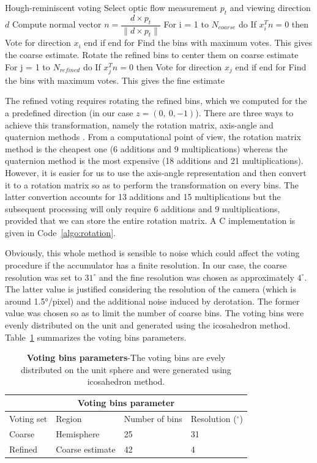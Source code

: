 \begin{algorithm}[colback=white, label=algo:houghVoting]{Hough-reminiscent voting}
Select optic flow measurement $p_t$ and viewing direction $d$
Compute normal vector $n = \dfrac{d \times p_t}{\|d \times p_t\|}$
For i = 1 to $N_{coarse}$ do
   If $x_i^Tn = 0$ then
      Vote for direction $x_i$
   end if
end for
Find the bins with maximum votes. This gives the coarse estimate.
Rotate the refined bins to center them on coarse estimate
For j = 1 to $N_{refined}$ do
   If $x_j^Tn = 0$ then
      Vote for direction $x_j$
   end if
end for
Find the bins with maximum votes. This gives the fine estimate
\end{algorithm}

The refined voting requires rotating the refined bins, which we computed for the a predefined direction (in our case $z = (0,~ 0,-1)$). There are three ways to achieve this transformation, namely the rotation matrix, axis-angle and quaternion methods \cite{rotation}. From a computational point of view, the rotation matrix method is the cheapest one (6 additions and 9 multiplications) whereas the quaternion method is the most expensive (18 additions and 21 multiplications). However, it is easier for us to use the axis-angle representation and then convert it to a rotation matrix so as to perform the transformation on every bins. The latter convertion accounts for 13 additions and 15 multiplications but the subsequent processing will only require 6 additions and 9 multiplications, provided that we can store the entire rotation matrix. A C implementation is given in Code~\ref{algo:rotation}.

Obviously, this whole method is sensible to noise which could affect the voting procedure if the accumulator has a finite resolution. In our case, the coarse resolution was set to $31^\circ$ and the fine resolution was chosen as approximately $4^\circ$. The latter value is justified considering the resolution of the camera (which is around 1.5°/pixel) and the additional noise induced by derotation. The former value was chosen so as to limit the number of coarse bins. The voting bins were evenly distributed on the unit and generated using the icosahedron method. Table~\ref{tab:votingBins} summarizes the voting bins parameters.

\begin{table}[h!]
	\centering
	\begin{tabular}{|p{2cm}||p{3cm}|p{3cm}|p{3cm}|}
	   \hline
	   \multicolumn{4}{|c|}{Voting bins parameter} \\
	   \hline
	   Voting set & Region & Number of bins & Resolution ($^\circ$) \\
	   \hline
	   Coarse & Hemisphere & 25 & 31\\
	   \hline
	   Refined & Coarse estimate & 42 & 4\\
	   \hline
	\end{tabular}
	\caption{\textbf{Voting bins parameters}-The voting bins are evely distributed on the unit sphere and were generated using icosahedron method.}
	\label{tab:votingBins}
\end{table}

